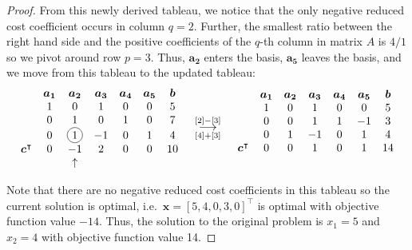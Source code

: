 \documentclass[12pt]{article}
\newcommand*\circled[1]{\tikz[baseline=(char.base)]{
            \node[shape=circle,draw,inner sep=2pt] (char) {#1};}}
\theoremstyle{definition}
\newcommand{\vect}[1]{\boldsymbol{#1}}
\newcommand{\grstep}[2][\relax]{%
   \ensuremath{\mathrel{
       {\mathop{\longrightarrow}\limits^{#2\mathstrut}_{
                                     \begin{subarray}{l} #1 \end{subarray}}}}}}
\begin{document}
\begin{proof}
  From this newly derived tableau, we notice that the only negative reduced cost coefficient
  occurs in column $q=2$. Further, the smallest ratio between the right hand side
  and the positive coefficients of the $q$-th column in matrix $A$ is $4/1$ so we pivot
  around row $p=3$. Thus, $\vect{a_2}$ enters the basis, $\vect{a_5}$ leaves the basis,
  and we move from this tableau to the updated tableau:
  \begin{align*}
    \begin{matrix}
      & \vect{a_1} & \vect{a_2} & \vect{a_3} & \vect{a_4} & \vect{a_5} & \vect{b} \\
                       & 1 & 0 & 1 & 0 & 0 & 5 \\
                       & 0 & 1 & 0 & 1 & 0 & 7 \\
                       & 0 & \circled{1} & -1 & 0 & 1 & 4 \\
      \vect{c}^\intercal & 0 & -1 & 2 & 0 & 0 & 10 \\
      & & \uparrow & & & & \\
    \end{matrix}
    \quad
    \begin{array}{c}
    \grstep[{[4] + [3]}]{[2] - [3]} \\
    \end{array}
    \quad
    \begin{matrix}
      & \vect{a_1} & \vect{a_2} & \vect{a_3} & \vect{a_4} & \vect{a_5} & \vect{b} \\
                       & 1 & 0 & 1 & 0 & 0 & 5 \\
                       & 0 & 0 & 1 & 1 & -1 & 3 \\
                       & 0 & 1 & -1 & 0 & 1 & 4 \\
      \vect{c}^\intercal & 0 & 0 & 1 & 0 & 1 & 14 \\
      & & & & & & \\
    \end{matrix}
  \end{align*}

  Note that there are no negative reduced cost coefficients in this tableau so the current solution
  is optimal, i.e.\ $\vect{x} = [5, 4, 0, 3, 0]^\intercal$ is optimal with objective function
  value $-14$. Thus, the solution to the original problem is $x_1 = 5$ and $x_2 = 4$
  with objective function value 14.

\end{proof}
\newpage
\end{document}
